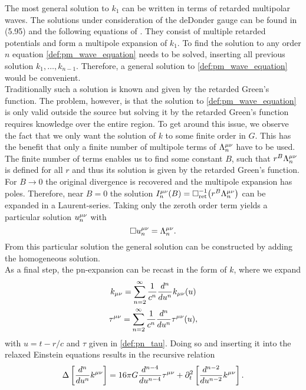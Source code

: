The most general solution to $k_1$ can be written in terms of retarded multipolar waves. The solutions under consideration of the deDonder gauge can be found in (5.95) and the following equations of \cite{gwv1}. They consist of multiple retarded potentials and form a multipole expansion of $k_1$. To find the solution to any order $n$ equation \eqref{def:pm_wave_equation} needs to be solved, inserting all previous solution $k_1,\dotsc,k_{n-1}$. Therefore, a general solution to \eqref{def:pm_wave_equation} would be convenient.\\
Traditionally such a solution is known and given by the retarded Green's function. The problem, however, is that the solution to \eqref{def:pm_wave_equation} is only valid outside the source but solving it by the retarded Green's function requires knowledge over the entire region. To get around this issue, we observe the fact that we only want the solution of $k$ to some finite order in $G$. This has the benefit that only a finite number of multipole terms of $\Lambda^{\mu\nu}_n$ have to be used. The finite number of terms enables us to find some constant $B$, such that $r^B\Lambda^{\mu\nu}_n$ is defined for all $r$ and thus its solution is given by the retarded Green's function. For $B\to 0$ the original divergence is recovered and the multipole expansion has poles. Therefore, near $B=0$ the solution $I^{\mu\nu}_n{\left( B \right)}=\Box^{-1}_\text{ret}{\left( r^B\Lambda^{\mu\nu}_n \right)}$ can be expanded in a Laurent-series. Taking only the zeroth order term yields a particular solution $u^{\mu\nu}_n$ with
\begin{equation}
\Box u^{\mu\nu}_n=\Lambda^{\mu\nu}_n.
\end{equation}
From this particular solution the general solution can be constructed by adding the homogeneous solution.\medskip\\
As a final step, the \gls{pn}-expansion can be recast in the form of $k$, where we expand
\begin{gather}
k_{\mu\nu} =\sum_{n=2}^\infty \frac{1}{c^n}\frac{d^n}{du^n}k_{\mu\nu}{\left( u \right)}\\
\tau^{\mu\nu}=\sum_{n=2}^\infty \frac{1}{c^n}\frac{d^n}{du^n}\tau^{\mu\nu}{\left( u \right)},
\end{gather}
with $u=t-r/c$ and $\tau$ given in \eqref{def:pn_tau}. Doing so and inserting it into the relaxed Einstein equations results in the recursive relation
\begin{equation}\label{def:k_solution_pn}
\Delta\left[\frac{d^n}{du^n}k^{\mu\nu}\right]=16\pi G\frac{d^{n-4}}{du^{n-4}}\tau^{\mu\nu}+\partial_t^2\left[\frac{d^{n-2}}{du^{n-2}}k^{\mu\nu}\right].
\end{equation}
